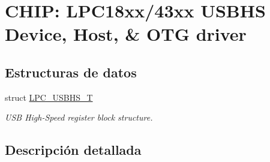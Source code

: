 \hypertarget{group___u_s_b_h_s__18_x_x__43_x_x}{}\section{C\+H\+IP\+: L\+P\+C18xx/43xx U\+S\+B\+HS Device, Host, \& O\+TG driver}
\label{group___u_s_b_h_s__18_x_x__43_x_x}
\subsection*{Estructuras de datos}
\begin{DoxyCompactItemize}
\item 
struct \hyperlink{struct_l_p_c___u_s_b_h_s___t}{L\+P\+C\+\_\+\+U\+S\+B\+H\+S\+\_\+T}
\begin{DoxyCompactList}\small\item\em U\+SB High-\/\+Speed register block structure. \end{DoxyCompactList}\end{DoxyCompactItemize}


\subsection{Descripción detallada}
